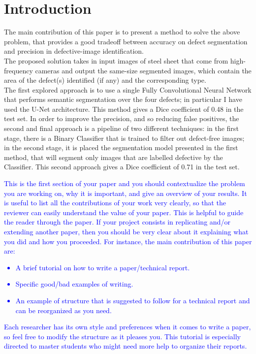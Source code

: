 \documentclass[10pt,twocolumn,letterpaper]{article}
\begin{document}
\section{Introduction}
   The main contribution of this paper is to present a method to solve the above problem, that provides a good tradeoff between accuracy on defect segmentation and precision in defective-image identification. \\
   The proposed solution takes in input images of steel sheet that come from high-frequency cameras and output the same-size segmented images, which contain the area of the defect(s) identified (if any) and the corresponding type. \\
   The first explored approach is to use a single Fully Convolutional Neural Network that performs semantic segmentation over the four defects; in particular I have used the U-Net architecture. This method gives a Dice coefficient of 0.48 in the test set.
   In order to improve the precision, and so reducing false positives, the second and final approach is a pipeline of two different techniques: in the first stage, there is a Binary Classifier that is trained to filter out defect-free images; in the second stage, it is placed the segmentation model presented in the first method, that will segment only images that are labelled defective by the Classifier. This second approach gives a Dice coefficient of 0.71 in the test set. 


   \textcolor{blue}{
   This is the first section of your paper and you should contextualize the problem you are working on, why it is important, and give an overview of your results. It is useful to list all the contributions of your work very clearly, so that the reviewer can easily understand the value of your paper. This is helpful to guide the reader through the paper. If your project consists in replicating and/or extending another paper, then you should be very clear about it explaining what you did and how you proceeded.
   For instance, the main contribution of this paper are: 
   \begin{itemize}
      \item A brief tutorial on how to write a paper/technical report.
      \item Specific good/bad examples of writing.
      \item An example of structure that is suggested to follow for a technical report and can be reorganized as you need.
   \end{itemize}
   Each researcher has its own style and preferences when it comes to write a paper, so feel free to modify the structure as it pleases you. 
   This tutorial is especially directed to master students who might need more help to organize their reports.}
\end{document}
